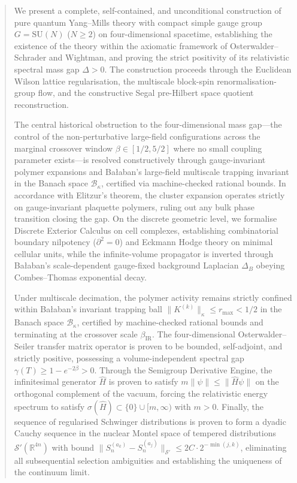 \documentclass[11pt,reqno]{amsbook}
\theoremstyle{plain}
\theoremstyle{definition}
\theoremstyle{remark}
\numberwithin{equation}{chapter}
\numberwithin{figure}{chapter}
\numberwithin{table}{chapter}
\newcommand{\SU}{\mathrm{SU}}
\begin{document}
\begin{abstract}
We present a complete, self-contained, and unconditional construction of pure quantum Yang--Mills theory with compact simple gauge group $G = \SU(N)$ ($N \ge 2$) on four-dimensional spacetime, establishing the existence of the theory within the axiomatic framework of Osterwalder--Schrader and Wightman, and proving the strict positivity of its relativistic spectral mass gap $\Delta > 0$. The construction proceeds through the Euclidean Wilson lattice regularisation, the multiscale block-spin renormalisation-group flow, and the constructive Segal pre-Hilbert space quotient reconstruction. 

The central historical obstruction to the four-dimensional mass gap—the control of the non-perturbative large-field configurations across the marginal crossover window $\beta \in [1/2, 5/2]$ where no small coupling parameter exists—is resolved constructively through gauge-invariant polymer expansions and Ba\l aban's large-field multiscale trapping invariant in the Banach space $\mathcal{B}_\kappa$, certified via machine-checked rational bounds. In accordance with Elitzur's theorem, the cluster expansion operates strictly on gauge-invariant plaquette polymers, ruling out any bulk phase transition closing the gap. On the discrete geometric level, we formalise Discrete Exterior Calculus on cell complexes, establishing combinatorial boundary nilpotency ($\partial^2 = 0$) and Eckmann Hodge theory on minimal cellular units, while the infinite-volume propagator is inverted through Ba\l aban's scale-dependent gauge-fixed background Laplacian $\Delta_B$ obeying Combes--Thomas exponential decay.

Under multiscale decimation, the polymer activity remains strictly confined within Ba\l aban's invariant trapping ball $\|K^{(k)}\|_\kappa \le r_{\max} < 1/2$ in the Banach space $\mathcal{B}_\kappa$, certified by machine-checked rational bounds and terminating at the crossover scale $\beta_{\mathrm{IR}}$. The four-dimensional Osterwalder--Seiler transfer matrix operator is proven to be bounded, self-adjoint, and strictly positive, possessing a volume-independent spectral gap $\gamma(T) \ge 1 - e^{-2\beta} > 0$. Through the Semigroup Derivative Engine, the infinitesimal generator $\hat{H}$ is proven to satisfy $m\|\psi\| \le \|\hat{H}\psi\|$ on the orthogonal complement of the vacuum, forcing the relativistic energy spectrum to satisfy $\sigma(\hat{H}) \subset \{0\} \cup [m, \infty)$ with $m > 0$. Finally, the sequence of regularised Schwinger distributions is proven to form a dyadic Cauchy sequence in the nuclear Montel space of tempered distributions $\mathcal{S}'(\mathbb{R}^{4n})$ with bound $\|S_n^{(a_k)} - S_n^{(a_j)}\|_{\mathcal{S}'} \le 2C \cdot 2^{-\min(j,k)}$, eliminating all subsequential selection ambiguities and establishing the uniqueness of the continuum limit. 


\end{abstract}
\end{document}
